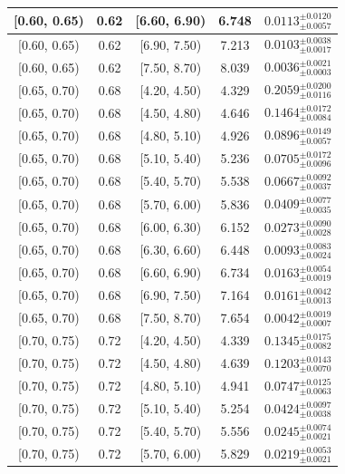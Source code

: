 \begin{longtable}{|c|c|c|c|c|}
\hline
[0.60, 0.65) & 0.62 & [6.60, 6.90) & 6.748 & $0.0113^{ \pm 0.0120 }_{ \pm 0.0057 }$ \\ 
\hline
[0.60, 0.65) & 0.62 & [6.90, 7.50) & 7.213 & $0.0103^{ \pm 0.0038 }_{ \pm 0.0017 }$ \\ 
\hline
[0.60, 0.65) & 0.62 & [7.50, 8.70) & 8.039 & $0.0036^{ \pm 0.0021 }_{ \pm 0.0003 }$ \\ 
\hline
[0.65, 0.70) & 0.68 & [4.20, 4.50) & 4.329 & $0.2059^{ \pm 0.0200 }_{ \pm 0.0116 }$ \\ 
\hline
[0.65, 0.70) & 0.68 & [4.50, 4.80) & 4.646 & $0.1464^{ \pm 0.0172 }_{ \pm 0.0084 }$ \\ 
\hline
[0.65, 0.70) & 0.68 & [4.80, 5.10) & 4.926 & $0.0896^{ \pm 0.0149 }_{ \pm 0.0057 }$ \\ 
\hline
[0.65, 0.70) & 0.68 & [5.10, 5.40) & 5.236 & $0.0705^{ \pm 0.0172 }_{ \pm 0.0096 }$ \\ 
\hline
[0.65, 0.70) & 0.68 & [5.40, 5.70) & 5.538 & $0.0667^{ \pm 0.0092 }_{ \pm 0.0037 }$ \\ 
\hline
[0.65, 0.70) & 0.68 & [5.70, 6.00) & 5.836 & $0.0409^{ \pm 0.0077 }_{ \pm 0.0035 }$ \\ 
\hline
[0.65, 0.70) & 0.68 & [6.00, 6.30) & 6.152 & $0.0273^{ \pm 0.0090 }_{ \pm 0.0028 }$ \\ 
\hline
[0.65, 0.70) & 0.68 & [6.30, 6.60) & 6.448 & $0.0093^{ \pm 0.0083 }_{ \pm 0.0024 }$ \\ 
\hline
[0.65, 0.70) & 0.68 & [6.60, 6.90) & 6.734 & $0.0163^{ \pm 0.0054 }_{ \pm 0.0019 }$ \\ 
\hline
[0.65, 0.70) & 0.68 & [6.90, 7.50) & 7.164 & $0.0161^{ \pm 0.0042 }_{ \pm 0.0013 }$ \\ 
\hline
[0.65, 0.70) & 0.68 & [7.50, 8.70) & 7.654 & $0.0042^{ \pm 0.0019 }_{ \pm 0.0007 }$ \\ 
\hline
[0.70, 0.75) & 0.72 & [4.20, 4.50) & 4.339 & $0.1345^{ \pm 0.0175 }_{ \pm 0.0082 }$ \\ 
\hline
[0.70, 0.75) & 0.72 & [4.50, 4.80) & 4.639 & $0.1203^{ \pm 0.0143 }_{ \pm 0.0070 }$ \\ 
\hline
[0.70, 0.75) & 0.72 & [4.80, 5.10) & 4.941 & $0.0747^{ \pm 0.0125 }_{ \pm 0.0063 }$ \\ 
\hline
[0.70, 0.75) & 0.72 & [5.10, 5.40) & 5.254 & $0.0424^{ \pm 0.0097 }_{ \pm 0.0038 }$ \\ 
\hline
[0.70, 0.75) & 0.72 & [5.40, 5.70) & 5.556 & $0.0245^{ \pm 0.0074 }_{ \pm 0.0021 }$ \\ 
\hline
[0.70, 0.75) & 0.72 & [5.70, 6.00) & 5.829 & $0.0219^{ \pm 0.0053 }_{ \pm 0.0021 }$ \\ 

\end{longtable}
